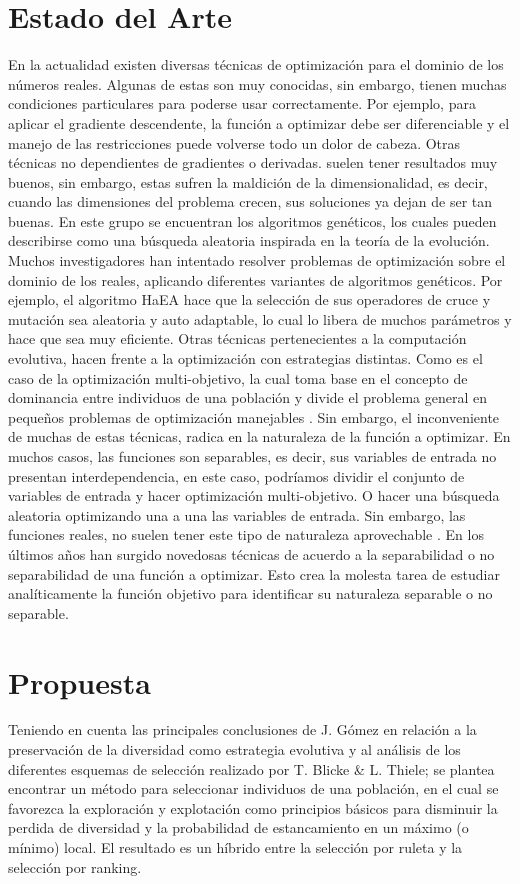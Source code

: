 \documentclass{llncs}
\begin{document}
\section{Estado del Arte}
En la actualidad existen diversas técnicas de optimización para el dominio de los números reales. Algunas de estas son muy conocidas, sin embargo, tienen muchas condiciones particulares para poderse usar correctamente. Por ejemplo, para aplicar el gradiente descendente, la función a optimizar debe ser diferenciable y el manejo de las restricciones puede volverse todo un dolor de cabeza. Otras técnicas no dependientes de gradientes o derivadas. suelen tener  resultados muy buenos, sin embargo, estas sufren la maldición de la dimensionalidad, es decir, cuando las dimensiones del problema crecen, sus soluciones ya dejan de ser tan buenas. En este grupo se encuentran los algoritmos genéticos, los cuales pueden describirse como una búsqueda aleatoria inspirada en la teoría de la evolución.
Muchos investigadores han intentado resolver problemas de optimización sobre el dominio de los reales, aplicando diferentes variantes de algoritmos genéticos. Por ejemplo, el algoritmo HaEA \cite{gomez} hace que la selección de sus operadores de cruce y mutación sea aleatoria y auto adaptable, lo cual lo libera de muchos parámetros y hace que sea muy eficiente. Otras técnicas pertenecientes a la computación evolutiva, hacen frente a la optimización con estrategias distintas. Como es el caso de la optimización multi-objetivo, la cual toma base en el concepto de dominancia entre individuos de una población y divide el problema general en pequeños problemas de optimización manejables \cite{zitzler:laumans:thiele}. Sin embargo, el inconveniente de muchas de estas técnicas, radica en la naturaleza de la función a optimizar. En muchos casos, las funciones son separables, es decir, sus variables de entrada no presentan interdependencia, en este caso, podríamos dividir el conjunto de variables de entrada y hacer optimización multi-objetivo. O hacer una búsqueda aleatoria optimizando una a una las variables de entrada. Sin embargo, las funciones reales, no suelen tener este tipo de naturaleza aprovechable \cite{caaman}. 
En los últimos años han surgido novedosas técnicas de acuerdo a la separabilidad o no separabilidad de una función a optimizar. Esto crea la molesta tarea de estudiar analíticamente la función objetivo para identificar su naturaleza separable o no separable.

\section{Propuesta}
Teniendo en cuenta las principales conclusiones de J. Gómez \cite{gomez} en relación a la preservación de la diversidad como estrategia evolutiva y al análisis de los diferentes esquemas de selección realizado por T. Blicke \& L. Thiele\cite{blick:thiele}; se plantea encontrar un método para seleccionar individuos de una población, en el cual se favorezca la exploración y explotación como principios básicos para disminuir la perdida de diversidad y la probabilidad de estancamiento en un máximo (o mínimo) local. El resultado es un híbrido entre la selección por ruleta y la selección por ranking.
\end{document}
